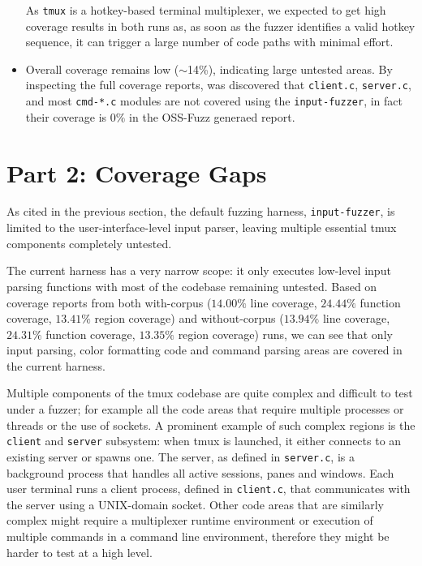 \documentclass[11pt,a4paper,twocolumn]{article}
\begin{document}
\begin{itemize}
	      As \texttt{tmux} is a hotkey-based terminal multiplexer, we expected to get high coverage results in both runs as, as soon as the fuzzer identifies a valid hotkey sequence, it can trigger a large number of code paths with minimal effort.

	\item Overall coverage remains low ($\sim$14\%), indicating large untested areas. By inspecting the full coverage reports, was discovered that \texttt{client.c}, \texttt{server.c}, and most \texttt{cmd-*.c} modules are not covered using the \texttt{input-fuzzer}, in fact their coverage is $0\%$ in the OSS-Fuzz generaed report.
\end{itemize}

\section*{Part 2: Coverage Gaps}

As cited in the previous section, the default fuzzing harness, \texttt{input-fuzzer}, is limited to the user-interface-level input parser, leaving multiple essential tmux components completely untested.

The current harness has a very narrow scope: it only executes low-level input parsing functions with most of the codebase remaining untested. Based on coverage reports from both with-corpus ($14.00\%$ line coverage, $24.44\%$ function coverage, $13.41\%$ region coverage) and without-corpus ($13.94\%$ line coverage, $24.31\%$ function coverage, $13.35\%$ region coverage) runs, we can see that only input parsing, color formatting code and command parsing areas are covered in the current harness.

Multiple components of the tmux codebase are quite complex and difficult to test under a fuzzer; for example all the code areas that require multiple processes or threads or the use of sockets. A prominent example of such complex regions is the \texttt{client} and \texttt{server} subsystem: when tmux is launched, it either connects to an existing server or spawns one. The server, as defined in \texttt{server.c}, is a background process that handles all active sessions, panes and windows. Each user terminal runs a client process, defined in \texttt{client.c}, that communicates with the server using a UNIX-domain socket. Other code areas that are similarly complex might require a multiplexer runtime environment or execution of multiple commands in a command line environment, therefore they might be harder to test at a high level.
\end{document}
